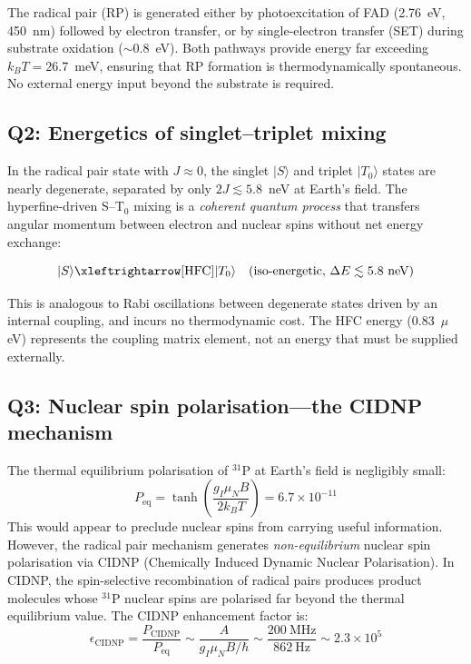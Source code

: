 The radical pair (RP) is generated either by photoexcitation of FAD (2.76~eV, 450~nm) followed by electron transfer, or by single-electron transfer (SET) during substrate oxidation ($\sim$0.8~eV)\cite{Edmondson2004}. Both pathways provide energy far exceeding $k_BT = 26.7$~meV, ensuring that RP formation is thermodynamically spontaneous. No external energy input beyond the substrate is required.

\subsection{Q2: Energetics of singlet--triplet mixing}

In the radical pair state with $J \approx 0$, the singlet $|S\rangle$ and triplet $|T_0\rangle$ states are nearly degenerate, separated by only $2J \lesssim 5.8$~neV at Earth's field. The hyperfine-driven S--T$_0$ mixing is a \emph{coherent quantum process} that transfers angular momentum between electron and nuclear spins without net energy exchange\cite{Steiner1989,Hore2016}:

\begin{equation}
|S\rangle \xleftrightarrow[\text{HFC}]{} |T_0\rangle \quad \text{(iso-energetic, } \Delta E \lesssim 5.8\text{ neV)}
\label{eq:ST_isoenergetic}
\end{equation}

This is analogous to Rabi oscillations between degenerate states driven by an internal coupling, and incurs no thermodynamic cost. The HFC energy (0.83~$\mu$eV) represents the coupling matrix element, not an energy that must be supplied externally.

\subsection{Q3: Nuclear spin polarisation---the CIDNP mechanism}

The thermal equilibrium polarisation of $^{31}$P at Earth's field is negligibly small:
\begin{equation}
P_\mathrm{eq} = \tanh\!\left(\frac{g_I \mu_N B}{2k_BT}\right) = 6.7 \times 10^{-11}
\label{eq:thermal_pol}
\end{equation}
This would appear to preclude nuclear spins from carrying useful information. However, the radical pair mechanism generates \emph{non-equilibrium} nuclear spin polarisation via CIDNP (Chemically Induced Dynamic Nuclear Polarisation)\cite{Closs1969,Kaptein1969}. In CIDNP, the spin-selective recombination of radical pairs produces product molecules whose $^{31}$P nuclear spins are polarised far beyond the thermal equilibrium value. The CIDNP enhancement factor is:
\begin{equation}
\epsilon_\mathrm{CIDNP} = \frac{P_\mathrm{CIDNP}}{P_\mathrm{eq}} \sim \frac{A}{g_I\mu_N B / \hbar} \sim \frac{200~\text{MHz}}{862~\text{Hz}} \sim 2.3 \times 10^5
\label{eq:cidnp}
\end{equation}

